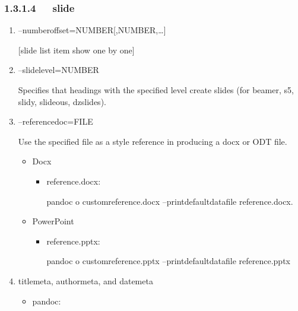 \documentclass[letterpaper,12pt,english]{sphinxmanual}
\begin{document}
\subsubsection{1.3.1.4   slide}
\label{\detokenize{001software/001install/pandoc:slide}}\begin{enumerate}
%
\item {} 
–number\sphinxhyphen{}offset=NUMBER{[},NUMBER,…{]}

{[}slide list item show one by one{]}

\item {} 
–slide\sphinxhyphen{}level=NUMBER

Specifies that headings with the specified level create slides (for
beamer, s5, slidy, slideous, dzslides).

\item {} 
–reference\sphinxhyphen{}doc=FILE

Use the specified file as a style reference in producing a docx or
ODT file.
\begin{itemize}
\item {} 
Docx
\begin{itemize}
\item {} 
reference.docx:

pandoc \sphinxhyphen{}o custom\sphinxhyphen{}reference.docx –print\sphinxhyphen{}default\sphinxhyphen{}data\sphinxhyphen{}file
reference.docx.

\end{itemize}

\item {} 
PowerPoint
\begin{itemize}
\item {} 
reference.pptx:

pandoc \sphinxhyphen{}o custom\sphinxhyphen{}reference.pptx –print\sphinxhyphen{}default\sphinxhyphen{}data\sphinxhyphen{}file
reference.pptx

\end{itemize}

\end{itemize}

\item {} 
title\sphinxhyphen{}meta, author\sphinxhyphen{}meta, and date\sphinxhyphen{}meta
\begin{itemize}
\item {} 
pandoc:

\begin{sphinxVerbatim}[commandchars=\\\{\}]
 
    
 


\end{sphinxVerbatim}
\end{itemize}
\end{enumerate}
\end{document}
